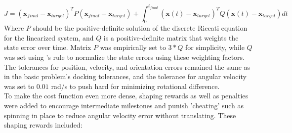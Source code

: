 \begin{equation}
    J = (\mathbf{x}_{final} - \mathbf{x}_{target})^T P (\mathbf{x}_{final} - \mathbf{x}_{target}) + \int_{0}^{t_{final}} (\mathbf{x}(t) - \mathbf{x}_{target})^T Q (\mathbf{x}(t) - \mathbf{x}_{target}) dt
\end{equation}
Where $P$ should be the positive-definite solution of the discrete Riccati equation for the linearized system, and $Q$ is a positive-definite matrix that weights the state error over time. Matrix $P$ was empirically set to $3*Q$ for simplicity, while $Q$ was set using \cite{bryson2018applied}'s rule to normalize the state errors using these weighting factors. The tolerances for position, velocity, and orientation errors remained the same as in the basic problem's docking tolerances, and the tolerance for angular velocity was set to $0.01$ rad/s to push hard for minimizing rotational difference.
\\
To make the cost function even more dense, shaping rewards as well as penalties were added to encourage intermediate milestones and punish 'cheating' such as spinning in place to reduce angular velocity error without translating. These shaping rewards included:
